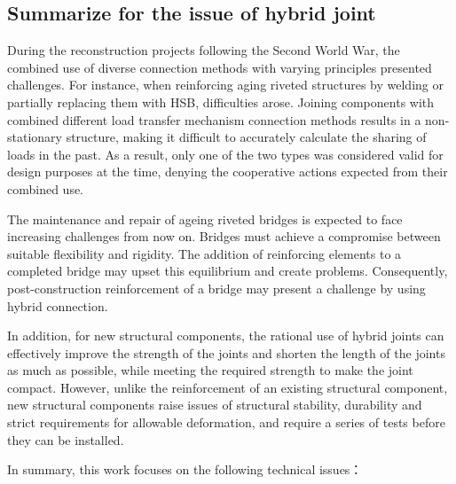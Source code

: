 \subsection{Summarize for the issue of hybrid joint}

During the reconstruction projects following the Second World War, the combined use of diverse connection methods with varying principles presented challenges. For instance, when reinforcing aging riveted structures by welding or partially replacing them with HSB, difficulties arose. Joining components with combined different load transfer mechanism connection methods results in a non-stationary structure, making it difficult to accurately calculate the sharing of loads in the past. As a result, only one of the two types was considered valid for design purposes at the time, denying the cooperative actions expected from their combined use.

The maintenance and repair of ageing riveted bridges is expected to face increasing challenges from now on. Bridges must achieve a compromise between suitable flexibility and rigidity. The addition of reinforcing elements to a completed bridge may upset this equilibrium and create problems. Consequently, post-construction reinforcement of a bridge may present a challenge by using hybrid connection.

In addition, for new structural components, the rational use of hybrid joints can effectively improve the strength of the joints and shorten the length of the joints as much as possible, while meeting the required strength to make the joint compact.  However, unlike the reinforcement of an existing structural component, new structural components raise issues of structural stability, durability and strict requirements for allowable deformation, and require a series of tests before they can be installed.

In summary, this work focuses on the following technical issues：


